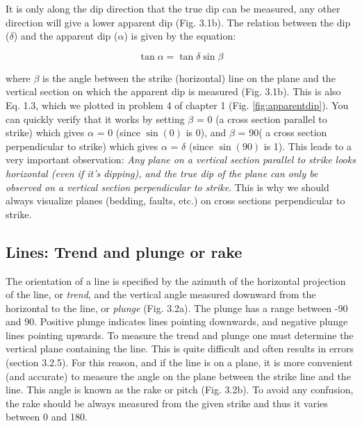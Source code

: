 \documentclass[a4paper , 12pt]{book}
\begin{document}
It is only along the dip direction that the true dip can be measured, any other direction will give a lower apparent dip (Fig. 3.1b). The relation between the dip ($\delta$) and the apparent dip ($\alpha$) is given by the equation:

\begin{equation}
    \tan\alpha=\tan\delta\sin\beta
\end{equation}

where $\beta$ is the angle between the strike (horizontal) line on the plane and the vertical section on which the apparent dip is measured (Fig. 3.1b). This is also Eq. 1.3, which we plotted in problem 4 of chapter 1 (Fig. \ref{fig:apparentdip}). You can quickly verify that it works by setting $\beta$ = 0 (a cross section parallel to strike) which gives $\alpha$ = 0 (since $\sin(0)$ is 0), and $\beta$ = 90\degree ( a cross section perpendicular to strike) which gives $\alpha$ = $\delta$ (since $\sin (90)$ is 1). This leads to a very important observation: \textit{Any plane on a vertical section parallel to strike looks horizontal (even if it’s dipping), and the true dip of the plane can only be observed on a vertical section perpendicular to strike}. This is why we should always visualize planes (bedding, faults, etc.) on cross sections perpendicular to strike.

\subsection{Lines: Trend and plunge or rake}

The orientation of a line is specified by the azimuth of the horizontal projection of the line, or \textit{trend}, and the vertical angle measured downward from the horizontal to the line, or \textit{plunge} (Fig. 3.2a). The plunge has a range between -90 and 90\degree. Positive plunge indicates lines pointing downwards, and negative plunge lines pointing upwards. To measure the trend and plunge one must determine the vertical plane containing the line. This is quite difficult and often results in errors (section 3.2.5). For this reason, and if the line is on a plane, it is more convenient (and accurate) to measure the angle on the plane between the strike line and the line. This angle is known as the rake or pitch (Fig. 3.2b). To avoid any confusion, the rake should be always measured from the given strike and thus it varies between 0 and 180\degree.
\end{document}
